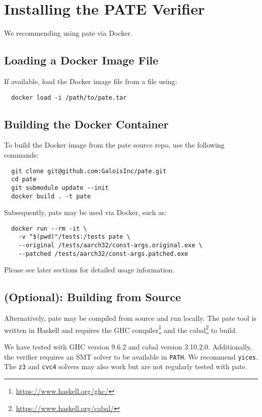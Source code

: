 \section{Installing the PATE Verifier}
\label{sec:build-pate-verif}

We recommending using pate via Docker.

\subsection{Loading a Docker Image File}

If available, load the Docker image file from a file using:
\begin{verbatim}
  docker load -i /path/to/pate.tar
\end{verbatim}

\subsection{Building the Docker Container}

To build the Docker image from the pate source repo, use the following commands:

\begin{verbatim}
  git clone git@github.com:GaloisInc/pate.git
  cd pate
  git submodule update --init
  docker build . -t pate
\end{verbatim}

Subsequently, pate may be used via Docker, such as:

\begin{verbatim}
  docker run --rm -it \
    -v "$(pwd)"/tests:/tests pate \
    --original /tests/aarch32/const-args.original.exe \
    --patched /tests/aarch32/const-args.patched.exe
\end{verbatim}

Please see later sections for detailed usage information.

\subsection{(Optional): Building from Source}

Alternatively, pate may be compiled from source and run locally.
The pate tool is written in Haskell and requires the GHC compiler\footnote{\url{https://www.haskell.org/ghc/}} and the cabal\footnote{\url{https://www.haskell.org/cabal/}} to build.

We have tested with GHC version 9.6.2 and cabal version 3.10.2.0.
Additionally, the verifier requires an SMT solver to be available in \texttt{PATH}.
We recommend \texttt{yices}.
The \texttt{z3} and \texttt{cvc4} solvers may also work but are not regularly tested with pate.

